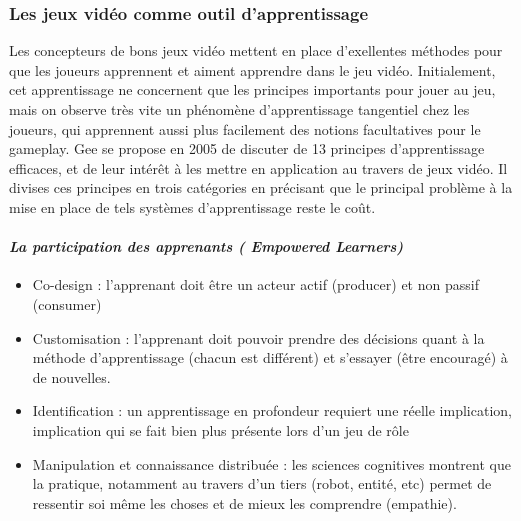 		\subsubsection*{Les jeux vidéo comme outil d'apprentissage}
Les concepteurs de bons jeux vidéo mettent en place d'exellentes méthodes pour que les joueurs apprennent et aiment apprendre dans le jeu vidéo. Initialement, cet apprentissage ne concernent que les principes importants pour jouer au jeu, mais on observe très vite un phénomène d'apprentissage tangentiel chez les joueurs, qui apprennent aussi plus facilement des notions facultatives pour le gameplay. Gee se propose en 2005 de discuter de 13 principes d'apprentissage efficaces, et de leur intérêt à les mettre en application au travers de jeux vidéo. Il divises ces principes en trois catégories en précisant que le principal problème à la mise en place de tels systèmes d'apprentissage reste le coût.
			\paragraph{\emph{La participation des apprenants ( Empowered Learners)}}
			\begin{itemize}
				\item {Co-design} : l'apprenant doit être un acteur actif (producer) et non passif (consumer)
				\item {Customisation} : l'apprenant doit pouvoir prendre des décisions quant à la méthode
d'apprentissage (chacun est différent) et s'essayer (être encouragé) à de nouvelles.
				\item {Identification} : un apprentissage en profondeur requiert une réelle implication,
implication qui se fait bien plus présente lors d'un jeu de rôle
				\item {Manipulation et connaissance distribuée} : les sciences cognitives montrent que la
pratique, notamment au travers d'un tiers (robot, entité, etc) permet de ressentir soi
même les choses et de mieux les comprendre (empathie).
			\end{itemize}

